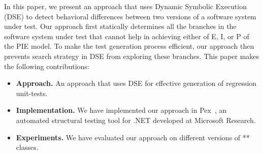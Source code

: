 In this paper, we present an approach that uses Dynamic Symbolic Execution (DSE) to detect behavioral differences between two versions of a software system under test. Our approach first statically determines all the branches in the software system under test that cannot help in achieving either of E, I, or P of the PIE model. To make the test generation process efficient, our approach then prevents search strategy in DSE from exploring these branches.
This paper makes the following contributions:
\begin{itemize}
	\item \textbf{Approach.} An approach that uses DSE for effective generation of regression unit-tests. 
	\item \textbf{Implementation.} We have implemented our approach in Pex~\cite{Pex}, an automated structural testing tool for .NET developed at Microsoft Research.
	\item \textbf{Experiments.} We have evaluated our approach on different versions of ** classes. 
\end{itemize}